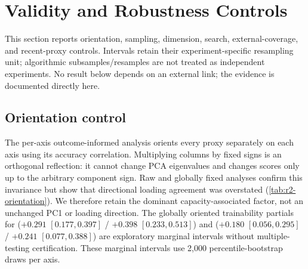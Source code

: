 \section{Validity and Robustness Controls}
\label{app:r2-controls}

This section reports orientation, sampling, dimension, search, external-coverage,
and recent-proxy controls.
Intervals retain their experiment-specific resampling unit; algorithmic
subsamples/resamples are not treated as independent experiments. No result below
depends on an external link; the evidence is documented directly here.

\subsection{Orientation control}
\label{app:r2-orientation}

The per-axis outcome-informed analysis orients every proxy separately on each axis using its
accuracy correlation. Multiplying columns by fixed signs is an orthogonal
reflection: it cannot change PCA eigenvalues and changes scores only up to the
arbitrary component sign. Raw and globally fixed analyses confirm this
invariance but show that directional loading agreement was overstated
(\cref{tab:r2-orientation}). We therefore retain the dominant
capacity-associated factor, not an unchanged PC1 or loading direction. The
globally oriented trainability partials for 
($+0.291$ $[0.177,0.397]$ / $+0.398$ $[0.233,0.513]$) and 
($+0.180$ $[0.056,0.295]$ / $+0.241$ $[0.077,0.388]$) are exploratory marginal
intervals without multiple-testing certification. These marginal intervals use
2,000 percentile-bootstrap draws per axis.

\begin{table}[t]
\centering\small\setlength{\tabcolsep}{4pt}
\caption{\textbf{Orientation affects cross-axis loading direction, not factor
strength.} T/S denote the NB201 topology/size axes.}
\label{tab:r2-orientation}
\end{table}

